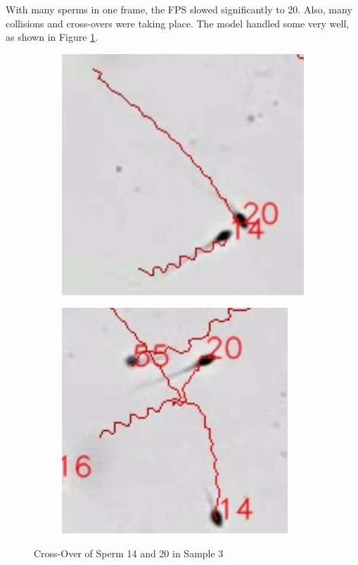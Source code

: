 With many sperms in one frame, the FPS slowed significantly to 20. Also, many collisions and cross-overs were taking place. The model handled some very well, as shown in Figure \ref{sam3col}.
\begin{figure}[h]
     \centering
     \begin{subfigure}[b]{0.34\textwidth}
         \centering
         \includegraphics[width=\textwidth]{Images/sam33.png}
     \end{subfigure}
     \hspace{4em}%
     \begin{subfigure}[b]{0.34\textwidth}
         \centering
         \includegraphics[width=\textwidth]{Images/sam333.png}
     \end{subfigure}
        \caption{Cross-Over of Sperm 14 and 20 in Sample 3}
        \label{sam3col}
\end{figure}

